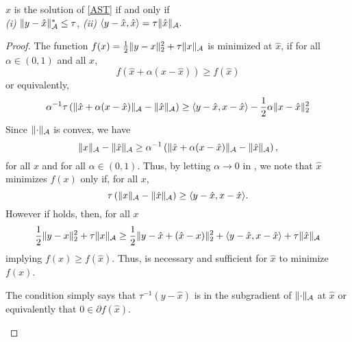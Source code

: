 \begin{lemma}
\label{lem:optimality-conditions}
$\hat{x}$ is the solution of \eqref{AST} if and only if\\
\emph{(i)}  $\lVert y - \hat{x}\rVert_{\mathcal{A}}^* \leq \tau$,
\emph{(ii)} $\langle y - \hat{x}, \hat{x}\rangle = \tau \lVert\hat{x}\rVert_{\mathcal{A}}.$
\end{lemma}
\begin{proof}
The function $f(x) = \tfrac{1}{2}\lVert y - x\rVert_2^2 + \tau\lVert x\rVert_{\mathcal{A}}$ is minimized at $\hat{x}$, if for all $\alpha \in (0,1)$ and all $x$,
\begin{equation*}
f(\hat{x} + \alpha(x - \hat{x})) \geq f(\hat{x})
\end{equation*}
or equivalently,
\begin{equation}
 \alpha^{-1} \tau \left(\lVert\hat{x} + \alpha(x - \hat{x})\rVert_{\mathcal{A}} - \lVert\hat{x}\rVert_{\mathcal{A}}  \right) \geq \langle y - \hat{x}, x - \hat{x}\rangle - \frac{1}{2}\alpha \lVert x - \hat{x}\rVert_2^2\label{eq:limit}
\end{equation}
Since $\lVert\cdot\rVert_{\mathcal{A}}$ is convex, we have
\[
\lVert x\rVert_{\mathcal{A}} - \lVert\hat{x}\rVert_{\mathcal{A}} \geq \alpha^{-1}  \left(\lVert\hat{x} + \alpha(x - \hat{x})\rVert_{\mathcal{A}} - \lVert\hat{x}\rVert_{\mathcal{A}} \right),
\]
for all $x$ and for all $\alpha \in (0,1)$. Thus, by letting $\alpha \to 0$ in , we note that $\hat{x}$ minimizes $f(x)$ only if, for all $x$,
\begin{equation}
\tau \left( \lVert x\rVert_{\mathcal{A}} - \lVert\hat{x}\rVert_{\mathcal{A}} \right) \geq \langle y - \hat{x}, x - \hat{x}\rangle.\label{eq:subgradient}
\end{equation}
However if  holds, then, for all $x$
\begin{align*}
\frac{1}{2}\| y - x \|_2^2 + \tau \lVert x\rVert_{\mathcal{A}}
\geq \frac{1}{2}\| y - \hat{x} + (\hat{x} - x) \|_2^2 + \langle y - \hat{x}, x - \hat{x}\rangle + \tau \lVert\hat{x}\rVert_{\mathcal{A}}
 \end{align*}
implying $f(x) \geq f(\hat{x}).$
Thus,  is necessary and sufficient for $\hat{x}$ to minimize $f(x)$. 
\begin{note}
The condition  simply says that $\tau^{-1} \left(y - \hat{x} \right)$ is in the subgradient of $\lVert\cdot\rVert_{\mathcal{A}}$ at $\hat{x}$ or equivalently that $0 \in \partial f(\hat{x})$.
\end{note}


\end{proof}
